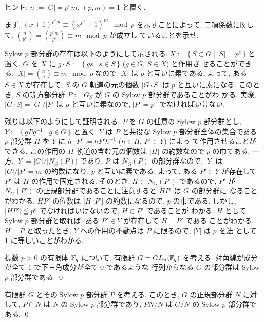 \documentclass[12pt,twoside]{jarticle}
\def\F{{\Bbb F}}
\begin{document}
\noindent ヒント: $n:=|G|=p^em$, $(p,m)=1$ と置く.

まず, $(x+1)^{p^em}\equiv(x^{p^e}+1)^m\mod p$ を示すことによって, 
二項係数に関して, ${n \choose p^e}={p^em\choose p^e}\equiv m \mod p$ が成立し
ていることを示せ.

Sylow $p$ 部分群の存在は以下のようにして示される. 
$X := \{\,S\subset G\mid |S|=p^e\,\}$ と置く.
$G$ を $X$ に $g\cdot S:=\{\,gs\mid s\in S\,\}$ ($g\in G$, $S\in X$) と作用さ
せることができる.
$|X|={n \choose q}\equiv m \mod p$ なので $|X|$ は $p$ と互いに素である.
よって, ある $S\in X$ が存在して, $S$ の $G$ 軌道の元の個数 $|G\cdot S|$ は %
$p$ と互いに素になる.
このとき, $S$ の等方部分群 $P:=G_S$ が $G$ の Sylow $p$ 部分群であることがわ
かる.
実際, $|G\cdot S|=|G|/|P|$ は $p$ と互いに素なので, 
$|P|=p^e$ でなければいけない.

残りは以下のようにして証明される.
$P$ を $G$ の任意の Sylow $p$ 部分群とし, 
$Y:=\{\,gPg^{-1}\mid g\in G\,\}$ と置く.
$Y$ は $P$ と共役な Sylow $p$ 部分群全体の集合である.
$p$ 部分群 $H$ を $Y$ に $h\cdot P':= hP'h^{-1}$ ($h\in H$, $P'\in Y$) によっ
て作用させることができる.
この作用の $H$ 軌道の含む元の個数は $|H|$ の約数なので $p$ の巾である.
一方, $|Y| = |G|/|N_G(P)|$ であり, $P$ は $N_G(P)$ の部分群なので, 
$|Y|$ は $|G|/|P|=m$ の約数になり, $p$ と互いに素である.
よって, ある $P'\in Y$ が存在して $P'$ は $H$ の作用で固定される.
そのとき, $H\subset N_G(P')$ であるので,
$P'$ が $N_G(P')$ の正規部分群であることに注意すると $HP'$ は $G$ の部分群に
なることがわかる.
$HP'$ の位数は $|H||P'|$ の約数になるので, $p$ の巾である.
しかし, $|HP'|\leqq p^e$ でなければいけないので, $H\subset P'$ であることが
わかる.
$H$ として Sylow $p$ 部分群と取れば, ある $P'\in Y$ が存在して $H=P'$ である
ことがわかる. 
$H=P$ と取ったとき, $Y$ への作用の不動点は $P$ に限るので, $|Y|$ は $p$ を法
として $1$ に等しいことがわかる.

\begin{question}
  標数 $p>0$ の有限体 $\F_q$ について, 有限群 $G=GL_n(\F_q)$ を考える.
  対角線が成分が全て $1$ で下三角成分が全て $0$ であるような
  行列からなる $G$ の部分群は Sylow $p$ 部分群である. \qed
\end{question}

\begin{question}
  有限群 $G$ とその Sylow $p$ 部分群 $P$ を考える.
  このとき, $G$ の正規部分群 $N$ に対して,
  $P\cap N$ は $N$ の Sylow $p$ 部分群であり,
  $PN/N$ は $G/N$ の Sylow $p$ 部分群である.
  \qed
\end{question}
\end{document}
